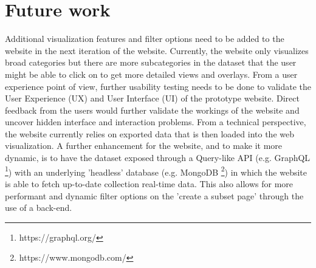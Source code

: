 \section{Future work}

Additional visualization features and filter options need to be added to the website in the next iteration of the website. Currently, the website only visualizes broad categories but there are more subcategories in the dataset that the user might be able to click on to get more detailed views and overlays. From a user experience point of view, further usability testing needs to be done to validate the User Experience (UX) and User Interface (UI) of the prototype website. Direct feedback from the users would further validate the workings of the website and uncover hidden interface and interaction problems. From a technical perspective, the website currently relies on exported data that is then loaded into the web visualization. A further enhancement for the website, and to make it more dynamic, is to have the dataset exposed through a Query-like API (e.g. GraphQL \footnote{https://graphql.org/}) with an underlying 'headless' database (e.g. MongoDB \footnote{https://www.mongodb.com/}) in which the website is able to fetch up-to-date collection real-time data. This also allows for more performant and dynamic filter options on the 'create a subset page' through the use of a back-end.
